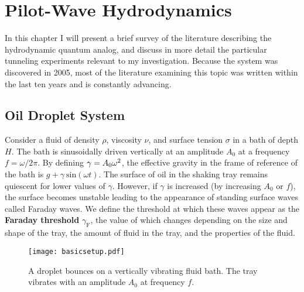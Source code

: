 \chapter{Pilot-Wave Hydrodynamics}
\label{Ch1}

In this chapter I will present a brief survey of the literature describing the hydrodynamic quantum analog, and discuss in more detail the particular tunneling experiments relevant to my investigation. Because the system was discovered in 2005, most of the literature examining this topic was written within the last ten years and is constantly advancing.


\section{Oil Droplet System}
	    \label{parameters}
	       Consider a fluid of density $\rho$, viscosity $\nu$, and surface tension $\sigma$ in a bath of depth $H$. The bath is sinusoidally driven vertically at an amplitude $A_0$ at a frequency $f=\omega/{2\pi}$. By defining $\mathnormal{\gamma}=A_0\omega^2$, the effective gravity in the frame of reference of the bath is $g+\gamma~\mathrm{sin}(\omega t)$. The surface of oil in the shaking tray remains quiescent for lower values of $\gamma$. However, if  $\gamma$ is increased (by increasing $A_0$ or $f$), the surface becomes unstable leading to the appearance of standing surface waves called Faraday waves. We define the threshold at which these waves appear as the \textbf{Faraday threshold} $\gamma_\mathrm{F}$, the value of which changes depending on the size and shape of the tray, the amount of fluid in the tray, and the properties of the fluid. 
	       
	   \begin{figure}[h]
	       \centering
	    \texttt{[image: basicsetup.pdf]}
	     \caption{A droplet bounces on a vertically vibrating fluid bath. The tray vibrates with an amplitude $A_0$ at frequency $f$.}
	 \label{basic}
	\end{figure}
	       
